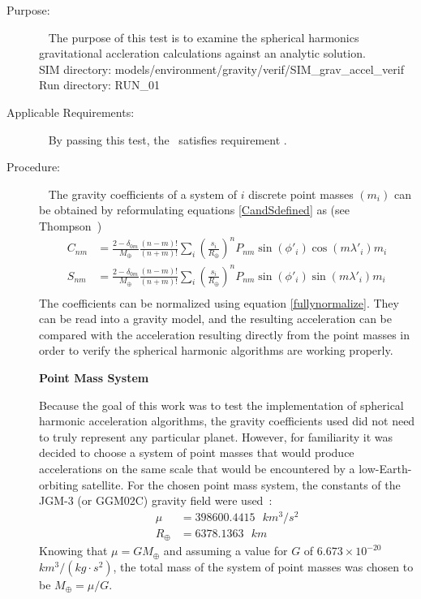 \label{test:spherharm_grav_accel}
\begin{description}
\item[Purpose:] \ \newline
The purpose of this test is to examine the spherical harmonics gravitational
accleration calculations against an analytic solution.\\
SIM directory: models/environment/gravity/verif/SIM\_grav\_accel\_verif\\
Run directory: RUN\_01
\item[Applicable Requirements:] \ \newline
By passing this test, the \ModelDesc\ satisfies requirement
.
\item[Procedure:]\ \newline
The gravity coefficients of a system of $i$ discrete point masses $(m_i)$ can be
obtained by reformulating equations \ref{CandSdefined} as
(see Thompson~\cite{thompson2008})
\begin{equation}\label{CandSdefinedptmasses}
\begin{aligned}
C_{nm}&=\frac{2-\delta_{0m}}{M_\oplus}\frac{(n-m)!}{(n+m)!}\sum_i\left(\frac{s_i}{R_\oplus}\right)^n
P_{nm}\sin(\phi'_i)\cos(m\lambda'_i)m_i\\
S_{nm}&=\frac{2-\delta_{0m}}{M_\oplus}\frac{(n-m)!}{(n+m)!}\sum_i\left(\frac{s_i}{R_\oplus}\right)^n
P_{nm}\sin(\phi'_i)\sin(m\lambda'_i)m_i\\
\end{aligned}
\end{equation}
The coefficients can be normalized using equation \ref{fullynormalize}. They can
be read into a gravity model, and the resulting acceleration can be compared
with the acceleration resulting directly from the point masses in order to
verify the spherical harmonic algorithms are working properly.

{\bf Point Mass System}

Because the goal of this work was to test the implementation of spherical
harmonic acceleration algorithms, the gravity coefficients used did not need to
truly represent any particular planet.  However, for familiarity it was decided
to choose a system of point masses that would produce accelerations on the same
scale that would be encountered by a low-Earth-orbiting satellite. For the
chosen point mass system, the constants of the JGM-3 (or GGM02C) gravity field
were used~\cite{MG}:
\begin{equation}\label{constants}
\begin{aligned}
\mu &= 398600.4415    \mbox{   $km^3/s^2$}\\
R_\oplus &= 6378.1363 \mbox{   $km$}
\end{aligned}
\end{equation}
Knowing that $\mu=GM_\oplus$ and assuming a value for $G$ of 
$6.673\times10^{-20}$ $km^3/(kg\cdot s^2)$, the total mass of the system of
point masses was chosen to be $M_\oplus=\mu/G$.


\end{description}

